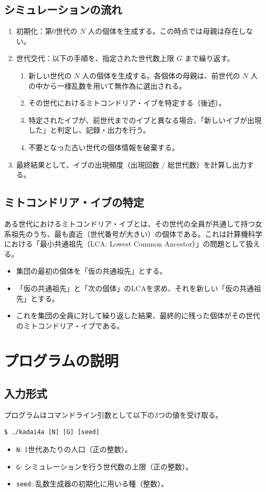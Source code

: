 \documentclass[a4paper,11pt]{jsarticle}
\begin{document}
\subsection{シミュレーションの流れ}
\begin{enumerate}
    \item 初期化：第0世代の $N$ 人の個体を生成する。この時点では母親は存在しない。
    \item 世代交代：以下の手順を、指定された世代数上限 $G$ まで繰り返す。
    \begin{enumerate}
        \item 新しい世代の $N$ 人の個体を生成する。各個体の母親は、前世代の $N$ 人の中から一様乱数を用いて無作為に選出される。
        \item その世代におけるミトコンドリア・イブを特定する（後述）。
        \item 特定されたイブが、前世代までのイブと異なる場合、「新しいイブが出現した」と判定し、記録・出力を行う。
        \item 不要となった古い世代の個体情報を破棄する。
    \end{enumerate}
    \item 最終結果として、イブの出現頻度（出現回数 / 総世代数）を計算し出力する。
\end{enumerate}

\subsection{ミトコンドリア・イブの特定}
ある世代におけるミトコンドリア・イブとは、その世代の全員が共通して持つ女系祖先のうち、最も直近（世代番号が大きい）の個体である。これは計算機科学における「最小共通祖先（LCA: Lowest Common Ancestor）」の問題として扱える。
\begin{itemize}
    \item 集団の最初の個体を「仮の共通祖先」とする。
    \item 「仮の共通祖先」と「次の個体」のLCAを求め、それを新しい「仮の共通祖先」とする。
    \item これを集団の全員に対して繰り返した結果、最終的に残った個体がその世代のミトコンドリア・イブである。
\end{itemize}

\section{プログラムの説明}

\subsection{入力形式}
% 
プログラムはコマンドライン引数として以下の3つの値を受け取る。
\begin{verbatim}
$ ./kadai4a [N] [G] [seed]
\end{verbatim}
\begin{itemize}
    \item \texttt{N}: 1世代あたりの人口（正の整数）。
    \item \texttt{G}: シミュレーションを行う世代数の上限（正の整数）。
    \item \texttt{seed}: 乱数生成器の初期化に用いる種（整数）。
\end{itemize}
\end{document}
